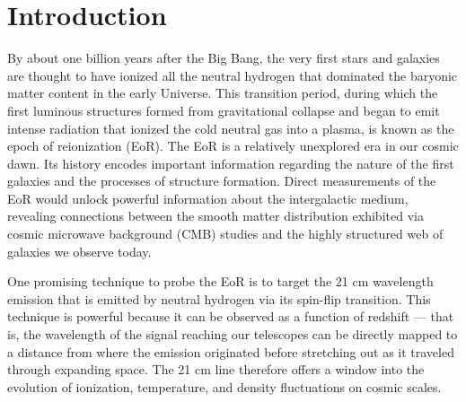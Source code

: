 \documentclass[preprint2,numberedappendix,tighten,twocolappendix]{aastex6}  %
\begin{document}
\section{Introduction}
\label{sec:Intro}

By about one billion years after the Big Bang, the very first stars and galaxies are thought to have ionized all the neutral hydrogen that dominated the baryonic matter content in the early Universe. This transition period, during which the first luminous structures formed from gravitational collapse and began to emit intense radiation that ionized the cold neutral gas into a plasma, is known as the epoch of reionization (EoR). The EoR is a relatively unexplored era in our cosmic dawn. Its history encodes important information regarding the nature of the first galaxies and the processes of structure formation. Direct measurements of the EoR would unlock powerful information about the intergalactic medium, revealing connections between the smooth matter distribution exhibited via cosmic microwave background (CMB) studies and the highly structured web of galaxies we observe today.

One promising technique to probe the EoR is to target the 21 cm wavelength emission that is emitted by neutral hydrogen via its spin-flip transition. This technique is powerful because it can be observed as a function of redshift --- that is, the wavelength of the signal reaching our telescopes can be directly mapped to a distance from where the emission originated before stretching out as it traveled through expanding space. The 21 cm line therefore offers a window into the evolution of ionization, temperature, and density fluctuations on cosmic scales.
\end{document}
